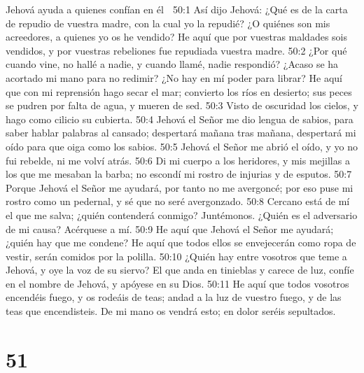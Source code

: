Jehová ayuda a quienes confían en él  

50:1 Así dijo Jehová: ¿Qué es de la carta de repudio de vuestra madre, con la cual yo la repudié? ¿O quiénes son mis acreedores, a quienes yo os he vendido? He aquí que por vuestras maldades sois vendidos, y por vuestras rebeliones fue repudiada vuestra madre.  
50:2 ¿Por qué cuando vine, no hallé a nadie, y cuando llamé, nadie respondió? ¿Acaso se ha acortado mi mano para no redimir? ¿No hay en mí poder para librar? He aquí que con mi reprensión hago secar el mar; convierto los ríos en desierto; sus peces se pudren por falta de agua, y mueren de sed. 
50:3 Visto de oscuridad los cielos, y hago como cilicio su cubierta.  
50:4 Jehová el Señor me dio lengua de sabios, para saber hablar palabras al cansado; despertará mañana tras mañana, despertará mi oído para que oiga como los sabios.  
50:5 Jehová el Señor me abrió el oído, y yo no fui rebelde, ni me volví atrás.  
50:6 Di mi cuerpo a los heridores, y mis mejillas a los que me mesaban la barba; no escondí mi rostro de injurias y de esputos. 
50:7 Porque Jehová el Señor me ayudará, por tanto no me avergoncé; por eso puse mi rostro como un pedernal, y sé que no seré avergonzado.  
50:8 Cercano está de mí el que me salva; ¿quién contenderá conmigo? Juntémonos. ¿Quién es el adversario de mi causa? Acérquese a mí.  
50:9 He aquí que Jehová el Señor me ayudará; ¿quién hay que me condene? He aquí que todos ellos se envejecerán como ropa de vestir, serán comidos por la polilla.  
50:10 ¿Quién hay entre vosotros que teme a Jehová, y oye la voz de su siervo? El que anda en tinieblas y carece de luz, confíe en el nombre de Jehová, y apóyese en su Dios.  
50:11 He aquí que todos vosotros encendéis fuego, y os rodeáis de teas; andad a la luz de vuestro fuego, y de las teas que encendisteis. De mi mano os vendrá esto; en dolor seréis sepultados.  

\chapter{51}

